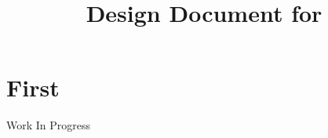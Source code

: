 \documentclass{../common/latex_classes/pdf_document}
\title{Design Document for \myTaxiService{}}
\begin{document}
	\titleToc{}
	\section{First}
		Work In Progress
\end{document}
